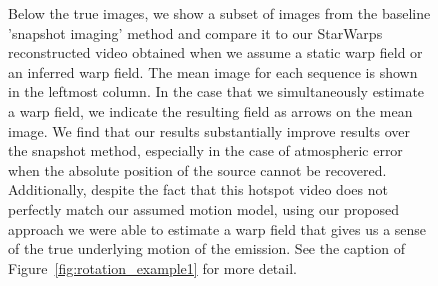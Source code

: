 \begin{figure}[h!]
\begin{center}
{		Below the true images, we show a subset of images from the baseline 'snapshot imaging' method and compare it to our StarWarps reconstructed video obtained when we assume a static warp field or an inferred warp field. The mean image for each sequence is shown in the leftmost column. In the case that we simultaneously estimate a warp field, we indicate the resulting field as arrows on the mean image. 
		We find that our results substantially improve results over the snapshot method, especially in the case of atmospheric error when the absolute position of the source cannot be recovered. 
		Additionally, despite the fact that this hotspot video does not perfectly match our assumed motion model, using our proposed approach we were able to estimate a warp field that gives us a sense of the true underlying motion of the emission. See the caption of Figure~\ref{fig:rotation_example1} for more detail.  }
		\label{fig:rotation_example2}
	\end{center}
\end{figure}

